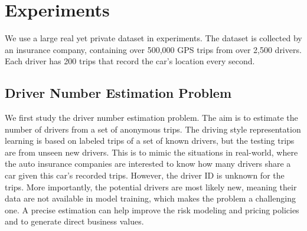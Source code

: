 \documentclass{article}
\begin{document}
\section{Experiments}
\label{sec:Experiments}
We use a large real yet private dataset %
in experiments.
The dataset is collected by an insurance company, containing
over 500,000 %
GPS trips from over 2,500 drivers.
Each driver has 200 trips that record the car's location every second.

\subsection{Driver Number Estimation Problem}
We first study the driver number estimation problem. %
The aim is to estimate the number of drivers from a set of anonymous trips.
The driving style representation learning is based on labeled trips of a set of known drivers, but the testing trips are from {unseen} new drivers. %
This is to mimic the situations in real-world, where the auto insurance companies are interested to know how many drivers share a car given this car's recorded trips. %
However, the driver ID is unknown for the trips.
More importantly, the potential drivers are most likely new, meaning their data are not available in model training, which makes the problem a challenging one.
A precise estimation can help improve the risk modeling and pricing policies and to generate direct business values.
\end{document}

